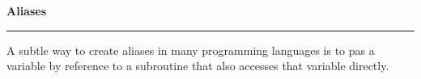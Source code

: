 \nopagenumbers
{\bf Aliases}
\vskip 1mm
\hrule

\vskip 6pt
A subtle way to create aliases in many programming languages is to pas a variable by reference to a subroutine that also accesses that variable directly.

\vfill\eject
\bye
